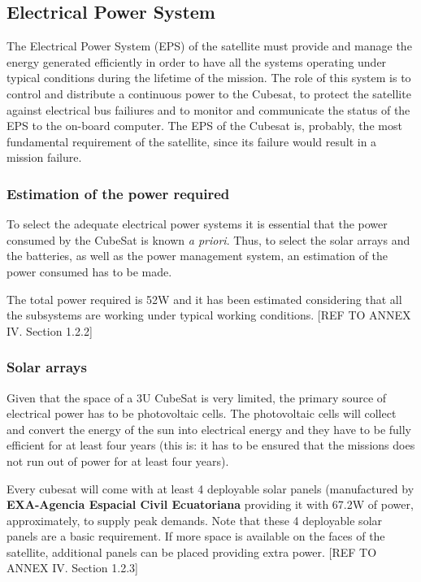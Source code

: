 \subsection{Electrical Power System}

The Electrical Power System (EPS) of the satellite must provide and manage the energy generated efficiently in order to have all the systems operating under typical conditions during the lifetime of the mission. The role of this system is to control and distribute a continuous power to the Cubesat, to protect the satellite against electrical bus failiures and to monitor and communicate the status of the EPS to the on-board computer. The EPS of the Cubesat is, probably, the most fundamental requirement of the satellite, since its failure would result in a mission failure. 

\subsubsection{Estimation of the power required}
To select the adequate electrical power systems it is essential that the power consumed by the CubeSat is known \textit{a priori}. Thus, to select the solar arrays and the batteries, as well as the power management system, an estimation of the power consumed has to be made.

The total power required is 52W and it has been estimated considering that all the subsystems are working under typical working conditions. [{REF TO ANNEX IV. Section 1.2.2}]

\subsubsection{Solar arrays}
Given that the space of a 3U CubeSat is very limited, the primary source of electrical power has to be photovoltaic cells. The photovoltaic cells will collect and convert the energy of the sun into electrical energy and they have to be fully efficient for at least four years (this is: it has to be ensured that the missions does not run out of power for at least four years). 

Every cubesat will come with at least 4 deployable solar panels (manufactured by \textbf{EXA-Agencia Espacial Civil Ecuatoriana} providing it with 67.2W of power, approximately, to supply peak demands. Note that these 4 deployable solar panels are a basic requirement. If more space is available on the faces of the satellite, additional panels can be placed providing extra power. [{REF TO ANNEX IV. Section 1.2.3}]

